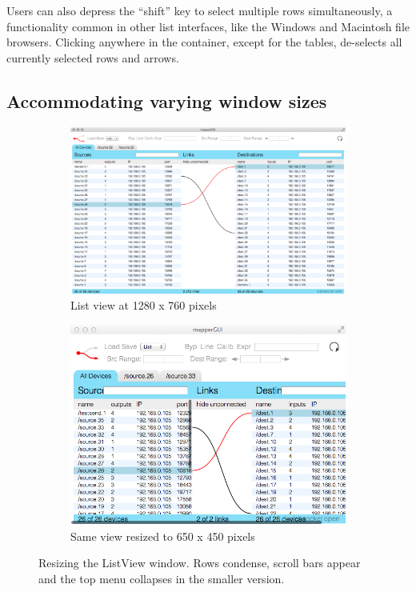 Users can also depress the ``shift'' key to select multiple rows simultaneously, a functionality common in other list interfaces, like the Windows and Macintosh file browsers. Clicking anywhere in the container, except for the tables, de-selects all currently selected rows and arrows.
	

	\subsection{Accommodating varying window sizes} %
	\label{sec:accomodating_sizes}

\begin{figure}
	\centering
	\begin{subfigure}[]{\textwidth}
		\centering
		\includegraphics[width=\textwidth]{figures/before_resize_1280x760}
		\caption{List view at 1280 x 760 pixels}
		\label{fig:before_resize}
	\end{subfigure}
	\begin{subfigure}[]{0.5\textwidth}
		\centering
		\includegraphics[width=\textwidth]{figures/after_resize_650x450}
		\caption{Same view resized to 650 x 450 pixels}
		\label{fig:after_resize}
	\end{subfigure}
	\caption{Resizing the ListView window. Rows condense, scroll bars appear and the top menu collapses in the smaller version.}\label{fig:resizing}
\end{figure}

